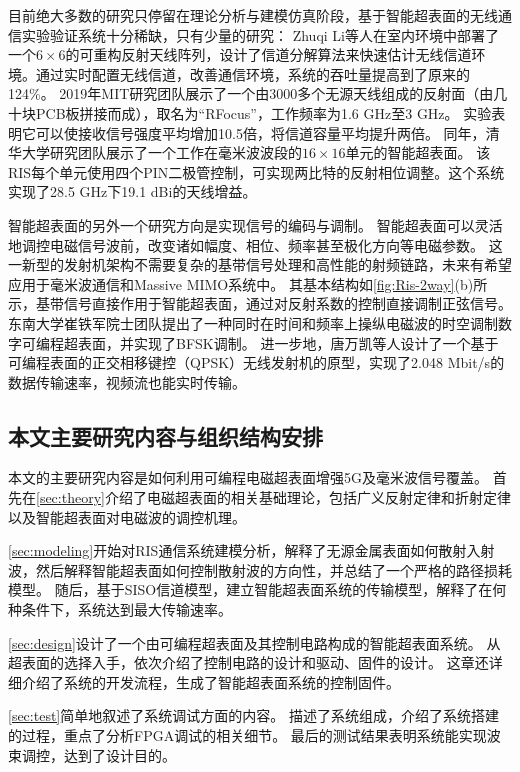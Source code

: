 \documentclass[supercite]{HustGraduPaper}
\begin{document}
目前绝大多数的研究只停留在理论分析与建模仿真阶段，基于智能超表面的无线通信实验验证系统十分稀缺，只有少量的研究：
Zhuqi Li等人在室内环境中部署了一个$ 6 \times 6 $的可重构反射天线阵列，设计了信道分解算法来快速估计无线信道环境\cite{li2019towards}。通过实时配置无线信道，改善通信环境，系统的吞吐量提高到了原来的124\%。
2019年MIT研究团队展示了一个由3000多个无源天线组成的反射面（由几十块PCB板拼接而成），取名为“RFocus”，工作频率为1.6 GHz至3 GHz。
实验表明它可以使接收信号强度平均增加10.5倍，将信道容量平均提升两倍\cite{arun2019rfocus}。
同年，清华大学研究团队展示了一个工作在毫米波波段的$ 16 \times 16 $单元的智能超表面。
该RIS每个单元使用四个PIN二极管控制，可实现两比特的反射相位调整。这个系统实现了28.5 GHz下19.1 dBi的天线增益\cite{Dai2020}。

智能超表面的另外一个研究方向是实现信号的编码与调制。
智能超表面可以灵活地调控电磁信号波前，改变诸如幅度、相位、频率甚至极化方向等电磁参数\cite{CHN_zhou2020}。
这一新型的发射机架构不需要复杂的基带信号处理和高性能的射频链路，未来有希望应用于毫米波通信和Massive MIMO系统中。
其基本结构如\autoref{fig:Ris-2way}(b)所示，基带信号直接作用于智能超表面，通过对反射系数的控制直接调制正弦信号。
东南大学崔铁军院士团队提出了一种同时在时间和频率上操纵电磁波的时空调制数字可编程超表面，并实现了BFSK调制\cite{zhao2019programmable}。
进一步地，唐万凯等人设计了一个基于可编程表面的正交相移键控（QPSK）无线发射机的原型，实现了2.048 Mbit/s的数据传输速率，视频流也能实时传输\cite{Tang2019Wireless}。

\subsection{本文主要研究内容与组织结构安排}

本文的主要研究内容是如何利用可编程电磁超表面增强5G及毫米波信号覆盖。
首先在\autoref{sec:theory}介绍了电磁超表面的相关基础理论，包括广义反射定律和折射定律以及智能超表面对电磁波的调控机理。

\autoref{sec:modeling}开始对RIS通信系统建模分析，解释了无源金属表面如何散射入射波，然后解释智能超表面如何控制散射波的方向性，并总结了一个严格的路径损耗模型。
随后，基于SISO信道模型，建立智能超表面系统的传输模型，解释了在何种条件下，系统达到最大传输速率。

\autoref{sec:design}设计了一个由可编程超表面及其控制电路构成的智能超表面系统。
从超表面的选择入手，依次介绍了控制电路的设计和驱动、固件的设计。
这章还详细介绍了系统的开发流程，生成了智能超表面系统的控制固件。

\autoref{sec:test}简单地叙述了系统调试方面的内容。
描述了系统组成，介绍了系统搭建的过程，重点了分析FPGA调试的相关细节。
最后的测试结果表明系统能实现波束调控，达到了设计目的。
\end{document}
